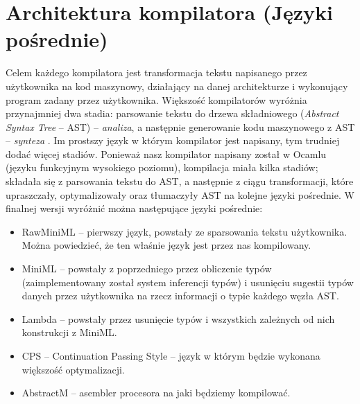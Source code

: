 \documentclass[11pt]{scrartcl}
\begin{document}
\section{Architektura kompilatora (Języki pośrednie)}
Celem każdego kompilatora jest transformacja tekstu napisanego przez użytkownika
na kod maszynowy, działający na danej architekturze i wykonujący program zadany
przez użytkownika.
Większość kompilatorów wyróżnia przynajmniej dwa stadia: parsowanie tekstu do
drzewa składniowego (\textit{Abstract Syntax Tree} -- AST) -- \textit{analiza}, a następnie
generowanie kodu maszynowego z AST -- \textit{synteza} \cite{Dragonbook}.
Im prostszy język w którym kompilator jest napisany, tym trudniej dodać więcej
stadiów.
Ponieważ nasz kompilator napisany został w Ocamlu (języku funkcyjnym wysokiego
poziomu), kompilacja miała kilka stadiów; składała się z parsowania tekstu do
AST, a następnie z ciągu transformacji, które upraszczały, optymalizowały oraz
tłumaczyły AST na kolejne języki pośrednie.
W finalnej wersji wyróżnić można następujące języki pośrednie:
\begin{itemize}
\item RawMiniML -- pierwszy język, powstały ze sparsowania tekstu użytkownika.
  Można powiedzieć, że ten właśnie język jest przez nas kompilowany.
\item MiniML -- powstały z poprzedniego przez obliczenie typów
  (zaimplementowany został system inferencji typów) i usunięciu sugestii typów
  danych przez użytkownika na rzecz informacji o typie każdego węzła AST.
\item Lambda -- powstały przez usunięcie typów i wszystkich zależnych od nich konstrukcji z MiniML.
\item CPS -- Continuation Passing Style -- język w którym będzie wykonana większość optymalizacji.
\item AbstractM -- asembler procesora na jaki będziemy kompilować.
\end{itemize}
\end{document}
